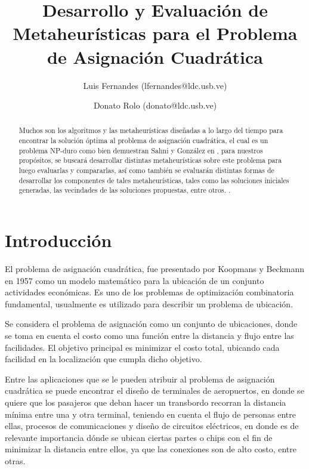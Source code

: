 \documentclass{ci5652}
\title{Desarrollo y Evaluación de Metaheurísticas para el Problema de Asignación Cuadrática}
\author{Luis Fernandes (lfernandes@ldc.usb.ve)
        \and
        Donato Rolo (donato@ldc.usb.ve)}
\begin{document}
\thispagestyle{empty}
\maketitle
\begin{abstract}

Muchos son los algoritmos y las metaheurísticas diseñadas a lo largo del tiempo para encontrar la solución óptima al problema de asignación cuadrática, el cual es un problema NP-duro como bien demuestran Sahni y González en \cite{sahni1976}, para nuestros propósitos, se buscará desarrollar distintas metaheurísticas sobre este problema para luego evaluarlas y compararlas, así como también se evaluarán distintas formas de desarrollar los componentes de tales metaheurísticas, tales como las soluciones iniciales generadas, las vecindades de las soluciones propuestas, entre otros. 
.
\end{abstract}

\section{Introducción}

El problema de asignación cuadrática, fue presentado por Koopmans y Beckmann en 1957 \cite{koopmans1957} como un modelo matemático para la ubicación de un conjunto actividades económicas.
Es uno de los problemas de optimización combinatoria fundamental, usualmente es utilizado para describir un problema de ubicación.

Se considera el problema de asignación como un conjunto de ubicaciones, donde se toma en cuenta el costo como una función entre la distancia y flujo entre las facilidades. El objetivo principal es minimizar el costo total, ubicando cada facilidad en la localización que cumpla dicho objetivo.

Entre las aplicaciones que se le pueden atribuir al problema de asignación cuadrática se puede encontrar el diseño de terminales de aeropuertos, en donde se quiere que los pasajeros que deban hacer un transbordo recorran la distancia mínima entre una y otra terminal, teniendo en cuenta el flujo de personas entre ellas, procesos de comunicaciones y diseño de circuitos eléctricos, en donde es de relevante importancia dónde se ubican ciertas partes o chips con el fin de minimizar la distancia entre ellos, ya que las conexiones son de alto costo, entre otras.
\end{document}
